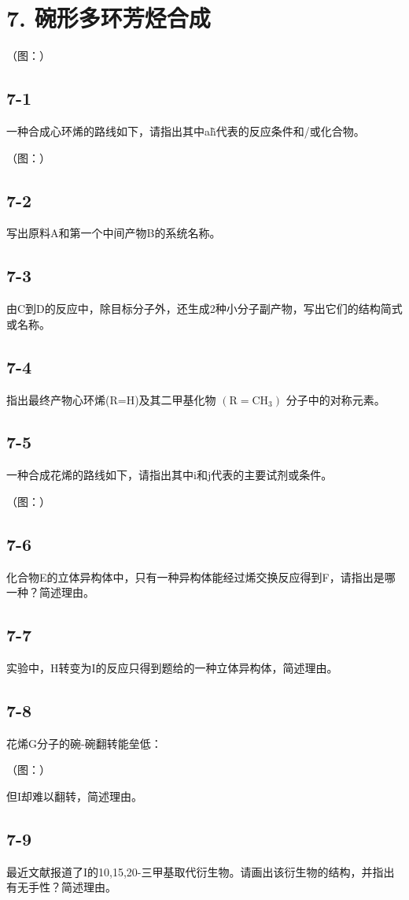 \section*{7. 碗形多环芳烃合成}
（图：）

\subsection*{7-1}
⼀种合成⼼环烯的路线如下，请指出其中a\~h代表的反应条件和/或化合物。

（图：）

\subsection*{7-2}
写出原料A和第⼀个中间产物B的系统名称。

\subsection*{7-3}
由C到D的反应中，除⽬标分⼦外，还⽣成2种⼩分⼦副产物，写出它们的结构简式或名称。

\subsection*{7-4}
指出最终产物⼼环烯(R=H)及其⼆甲基化物 $\mathrm { ( R = C H _ { 3 } ) }$ 分⼦中的对称元素。

\subsection*{7-5}
⼀种合成花烯的路线如下，请指出其中i和j代表的主要试剂或条件。

（图：）

\subsection*{7-6}
化合物E的⽴体异构体中，只有⼀种异构体能经过烯交换反应得到F，请指出是哪⼀种？简述理由。

\subsection*{7-7}
实验中，H转变为I的反应只得到题给的⼀种⽴体异构体，简述理由。

\subsection*{7-8}
花烯G分⼦的碗-碗翻转能垒低：

（图：）

但I却难以翻转，简述理由。

\subsection*{7-9}
最近⽂献报道了I的10,15,20-三甲基取代衍⽣物。请画出该衍⽣物的结构，并指出有⽆⼿性？简述理由。
